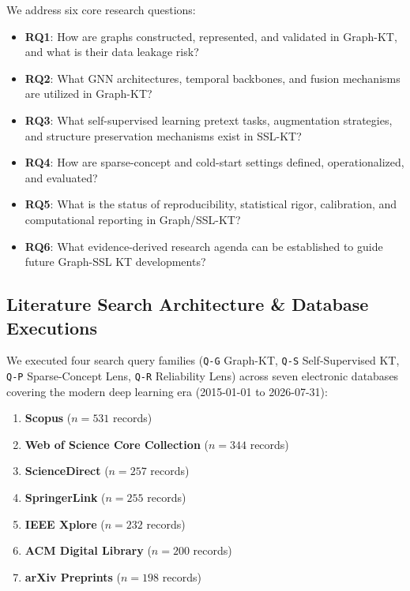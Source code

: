 \documentclass[10pt,journal,compsoc]{IEEEtran}
\begin{document}
We address six core research questions:
\begin{itemize}
    \item \textbf{RQ1}: How are graphs constructed, represented, and validated in Graph-KT, and what is their data leakage risk?
    \item \textbf{RQ2}: What GNN architectures, temporal backbones, and fusion mechanisms are utilized in Graph-KT?
    \item \textbf{RQ3}: What self-supervised learning pretext tasks, augmentation strategies, and structure preservation mechanisms exist in SSL-KT?
    \item \textbf{RQ4}: How are sparse-concept and cold-start settings defined, operationalized, and evaluated?
    \item \textbf{RQ5}: What is the status of reproducibility, statistical rigor, calibration, and computational reporting in Graph/SSL-KT?
    \item \textbf{RQ6}: What evidence-derived research agenda can be established to guide future Graph-SSL KT developments?
\end{itemize}

\subsection{Literature Search Architecture \& Database Executions}
We executed four search query families (\texttt{Q-G} Graph-KT, \texttt{Q-S} Self-Supervised KT, \texttt{Q-P} Sparse-Concept Lens, \texttt{Q-R} Reliability Lens) across seven electronic databases covering the modern deep learning era (2015-01-01 to 2026-07-31):
\begin{enumerate}
    \item \textbf{Scopus} ($n = 531$ records)
    \item \textbf{Web of Science Core Collection} ($n = 344$ records)
    \item \textbf{ScienceDirect} ($n = 257$ records)
    \item \textbf{SpringerLink} ($n = 255$ records)
    \item \textbf{IEEE Xplore} ($n = 232$ records)
    \item \textbf{ACM Digital Library} ($n = 200$ records)
    \item \textbf{arXiv Preprints} ($n = 198$ records)
\end{enumerate}
\end{document}
